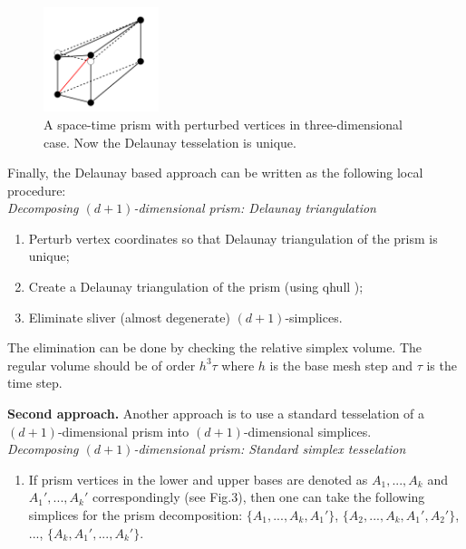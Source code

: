 \documentclass[12pt]{article}
\begin{document}
\begin{figure}[h]
\centering
\includegraphics[width = 0.3\textwidth]{perturbed_prism.png}
\caption{A space-time prism with perturbed vertices in three-dimensional case. Now the Delaunay tesselation is unique.}
\end{figure}

Finally, the Delaunay based approach can be written as the following local procedure: \\
\textit{Decomposing $(d+1)$-dimensional prism: Delaunay triangulation}
\begin{enumerate}
	\item Perturb vertex coordinates so that Delaunay triangulation of the prism is unique;
	\item Create a Delaunay triangulation of the prism (using qhull \cite{qhull});
	\item Eliminate sliver (almost degenerate) $(d+1)$-simplices.
	 \end{enumerate}
The elimination can be done by checking the relative simplex volume. The regular volume should be of order $h^3 \tau$ where $h$ is the base mesh step and $\tau$ is the time step.

\textbf{Second approach.} Another approach is to use a standard tesselation \cite{NeumuellerMeshgen} of a $(d+1)$-dimensional prism into $(d+1)$-dimensional simplices. \\
\textit{Decomposing $(d+1)$-dimensional prism: Standard simplex tesselation} 
\begin{enumerate}
	\item If prism vertices in the lower and upper bases are denoted as $A_1, ..., A_k$ and $A_1', ..., A_k'$ correspondingly (see Fig.3), then one can take the following simplices for the prism decomposition:
$\{A_1, ..., A_k, A_1'\}$, $\{A_2, ..., A_k, A_1', A_2'\}$, ..., $\{A_k, A_1', ..., A_k'\}$.
\end{enumerate}

\end{document}
